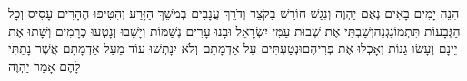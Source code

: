 \documentclass[../main/main.tex]{subfiles}
\begin{document}
\begin{multicols}{\ncols}
הִנֵּה יָמִים בָּאִים נְאֻם יַהְוֶה וְנִגַּשׁ חוֹרֵשׁ בַּקֹּצֵר וְדֹרֵךְ עֲנָבִים בְּמֹשֵׁךְ הַזָּרַע וְהִטִּיפוּ הֶהָרִים עָסִיס וְכָל הַגְּבָעוֹת תִּתְמוֹגַגְנָה\PreVerseSpace{}וְשַׁבְתִּי אֶת שְׁבוּת עַמִּי יִשְׂרָאֵל וּבָנוּ עָרִים נְשַׁמּוֹת וְיָשָׁבוּ וְנָטְעוּ כְרָמִים וְשָׁתוּ אֶת יֵינָם וְעָשׂוּ גַנּוֹת וְאָכְלוּ אֶת פְּרִיהֶם\PreVerseSpace{}וּנְטַעְתִּים עַל אַדְמָתָם וְלֹא יִנָּתְשׁוּ עוֹד מֵעַל אַדְמָתָם אֲשֶׁר נָתַתִּי לָהֶם אָמַר יַהְוֶה\par
\pagebreak
\end{multicols}
\end{document}
